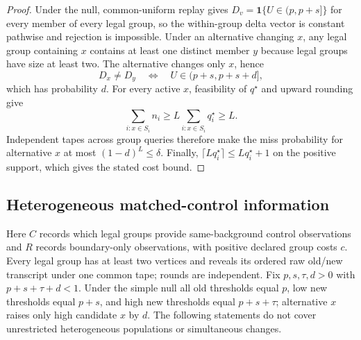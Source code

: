 \begin{proof}
Under the null, common-uniform replay gives
$D_v=\mathbf 1\{U\in(p,p+s]\}$ for every member of every legal group, so
the within-group delta vector is constant pathwise and rejection is impossible.
Under an alternative changing $x$, any legal group containing $x$ contains at
least one distinct member $y$ because legal groups have size at least two.
The alternative changes only $x$, hence
\begin{equation}\label{eq:formal-results-049}
D_x\ne D_y
\quad\Longleftrightarrow\quad
U\in(p+s,p+s+d],
\end{equation}
which has probability $d$.  For every active $x$, feasibility of $q^\star$
and upward rounding give
\begin{equation}\label{eq:formal-results-050}
\sum_{i:x\in S_i}n_i
\ge L\sum_{i:x\in S_i}q_i^\star
\ge L.
\end{equation}
Independent tapes across group queries therefore make the miss probability for
alternative $x$ at most $(1-d)^L\le\delta$.  Finally,
$\lceil Lq_i^\star\rceil\le Lq_i^\star+1$ on the positive support,
which gives the stated cost bound.
\end{proof}


\subsection{Heterogeneous matched-control information}


Here $C$ records which legal groups provide same-background control observations and $R$ records boundary-only observations, with positive declared group costs $c$. Every legal group has at least two vertices and reveals its ordered raw old/new transcript under one common tape; rounds are independent. Fix $p,s,\tau,d>0$ with $p+s+\tau+d<1$. Under the simple null all old thresholds equal $p$, low new thresholds equal $p+s$, and high new thresholds equal $p+s+\tau$; alternative $x$ raises only high candidate $x$ by $d$. The following statements do not cover unrestricted heterogeneous populations or simultaneous changes.


